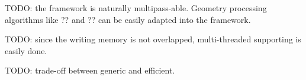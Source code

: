 



TODO: the framework is naturally multipass-able. Geometry processing
algorithms like ?? and ?? can be easily adapted into the framework.



TODO: since the writing memory is not overlapped, multi-threaded
supporting is easily done.

TODO: trade-off between generic and efficient.
 
